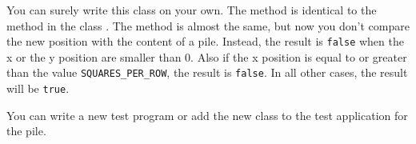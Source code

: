 You can surely write this class on your own. The method  is identical to the method in the class . The method  is almost the same, but now you don't compare the new position with the content of a pile. Instead, the result is \verb|false| when the x or the y position are smaller than 0. Also if the x position is equal to or greater than the value \verb|SQUARES_PER_ROW|, the result is \verb|false|. In all other cases, the result will be \verb|true|.

You can write a new test program or add the new class to the test application for the pile.